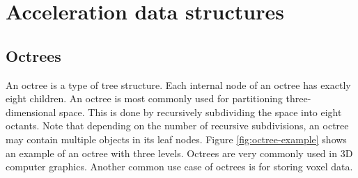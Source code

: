 \section{Acceleration data structures}
\subsection{Octrees}
\label{sec:theory-octree}
An octree is a type of tree structure. Each internal node of an octree has exactly eight children. An octree is most commonly used for partitioning three-dimensional space. This is done by recursively subdividing the space into eight octants. Note that depending on the number of recursive subdivisions, an octree may contain multiple objects in its leaf nodes. Figure \ref{fig:octree-example} shows an example of an octree with three levels. Octrees are very commonly used in 3D computer graphics. Another common use case of octrees is for storing voxel data. 


